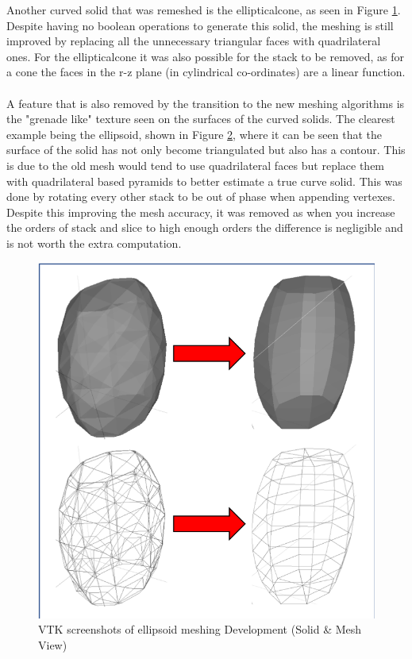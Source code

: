 \documentclass[12pt,a4paper]{article}
\begin{document}
\begin{figure}[h!]
\begin{minipage}{.4\textwidth}
  \label{elco1}
\end{minipage}%
\end{figure}

\noindent Another curved solid that was remeshed is the ellipticalcone, as seen in Figure \ref{elco1}. Despite having no boolean operations to generate this solid, the meshing is still improved by replacing all the unnecessary triangular faces with quadrilateral ones. For the ellipticalcone it was also possible for the stack to be removed, as for a cone the faces in the r-z plane (in cylindrical co-ordinates) are a linear function.
\\\\
\noindent A feature that is also removed by the transition to the new meshing algorithms is the "grenade like" texture seen on the surfaces of the curved solids. The clearest example being the ellipsoid, shown in Figure \ref{ellipme}, where it can be seen that the surface of the solid has not only become triangulated but also has a contour. This is due to the old mesh would tend to use quadrilateral faces but replace them with quadrilateral based pyramids to better estimate a true curve solid. This was done by rotating every other stack to be out of phase when appending vertexes. Despite this improving the mesh accuracy, it was removed as when you increase the orders of stack and slice to high enough orders the difference is negligible and is not worth the extra computation.  

\begin{figure}[h!]
\centering
\includegraphics[scale=0.6]{Images//Meshes//Ellipsoid.png}
\caption[width=\columnwidth]{VTK screenshots of ellipsoid meshing Development (Solid \& Mesh View)}
\label{ellipme}
\end{figure}
\end{document}
